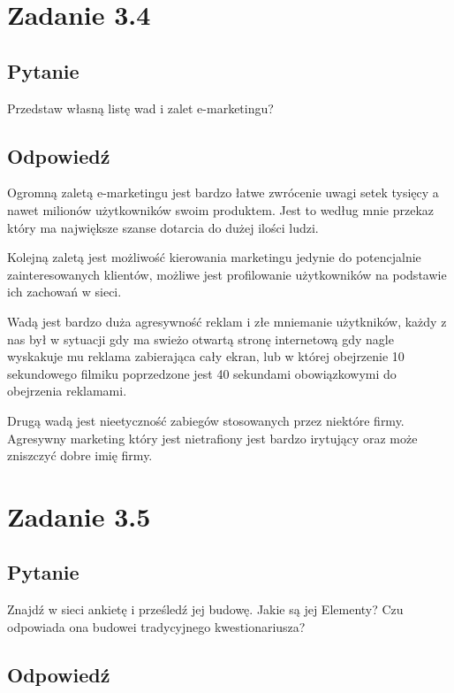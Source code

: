 \documentclass[paper=a4, fontsize=11pt]{scrartcl} %
\numberwithin{equation}{section} %
\numberwithin{figure}{section} %
\numberwithin{table}{section} %
\begin{document}
\section{Zadanie 3.4}

\subsection {Pytanie}

Przedstaw własną listę wad i zalet e-marketingu?

\subsection {Odpowiedź}

Ogromną zaletą e-marketingu jest bardzo łatwe zwrócenie uwagi setek tysięcy a nawet milionów użytkowników swoim produktem.
Jest to według mnie przekaz który ma największe szanse dotarcia do dużej ilości ludzi. 

Kolejną zaletą jest możliwość kierowania marketingu jedynie do potencjalnie zainteresowanych klientów, możliwe jest profilowanie
użytkowników na podstawie ich zachowań w sieci.

Wadą jest bardzo duża agresywność reklam i złe mniemanie użytkników, każdy z nas był w sytuacji gdy ma swieżo otwartą stronę internetową
gdy nagle wyskakuje mu reklama zabierająca cały ekran, lub w której obejrzenie 10 sekundowego filmiku poprzedzone jest 40 sekundami obowiązkowymi
do obejrzenia reklamami.

Drugą wadą jest nieetyczność zabiegów stosowanych przez niektóre firmy. Agresywny marketing który jest nietrafiony jest bardzo irytujący oraz
może zniszczyć dobre imię firmy.

\section{Zadanie 3.5}

\subsection {Pytanie}

Znajdź w sieci ankietę i prześledź jej budowę. Jakie są jej Elementy? Czu odpowiada
ona budowei tradycyjnego kwestionariusza?

\subsection {Odpowiedź}
\end{document}

